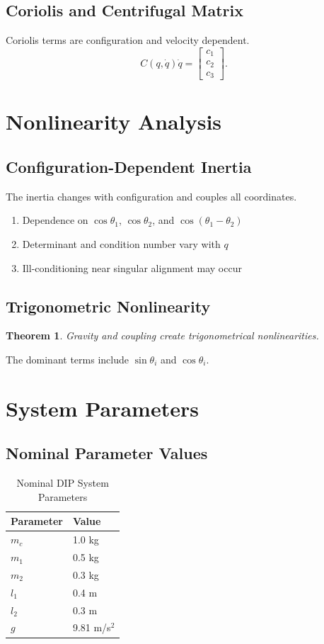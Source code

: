 \documentclass[11pt,a4paper]{article}
\newtheorem{theorem}{Theorem}[section]
\begin{document}
\subsection{Coriolis and Centrifugal Matrix}
Coriolis terms are configuration and velocity dependent.
\begin{equation}
    C(q,\dot q)\dot q = \begin{bmatrix}c_1\\ c_2\\ c_3\end{bmatrix}.
\end{equation}

\section{Nonlinearity Analysis}

\subsection{Configuration-Dependent Inertia}
The inertia changes with configuration and couples all coordinates.
\begin{enumerate}
    \item Dependence on $\cos\theta_1$, $\cos\theta_2$, and $\cos(\theta_1-\theta_2)$
    \item Determinant and condition number vary with $q$
    \item Ill-conditioning near singular alignment may occur
\end{enumerate}

\subsection{Trigonometric Nonlinearity}
\begin{theorem}
Gravity and coupling create trigonometrical nonlinearities.
\end{theorem}
The dominant terms include $\sin\theta_i$ and $\cos\theta_i$.

\section{System Parameters}

\subsection{Nominal Parameter Values}
\begin{table}[h]
\centering
\caption{Nominal DIP System Parameters}
\label{tab:nominal_parameters}
\begin{tabular}{@{}ll@{}}
\toprule
Parameter & Value \\
\midrule
$m_c$ & 1.0 kg \\
$m_1$ & 0.5 kg \\
$m_2$ & 0.3 kg \\
$l_1$ & 0.4 m \\
$l_2$ & 0.3 m \\
$g$ & 9.81 m/s$^2$ \\
\bottomrule
\end{tabular}
\end{table}
\end{document}
